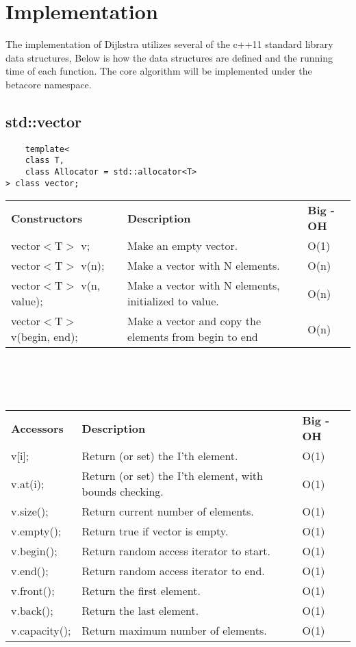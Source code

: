 \documentclass[12pt]{article}
\begin{document}
\section[Implementation]{Implementation}
The implementation of Dijkstra utilizes several of the c++11 standard library data structures,
Below is how the data structures are defined and the running time of each function\cite{ northwestern}.
The core algorithm will be implemented under the betacore namespace.
\subsection{std::vector}
\begin{lstlisting}
	template<
    class T,
    class Allocator = std::allocator<T>
> class vector;
\end{lstlisting}
\begin{tabular}{ l l l }
\textbf{Constructors} & \textbf{Description} & \textbf{Big - OH}\\
vector$<$T$>$ v; & Make an empty vector. & O(1)\\
vector$<$T$>$ v(n); & Make a vector with N elements. & O(n)\\
vector$<$T$>$ v(n, value); & Make a vector with N elements, initialized to value. & O(n)\\
vector$<$T$>$ v(begin, end); & Make a vector and copy the elements from begin to end & O(n)\\
\end{tabular}
\\
\\
\\
\begin{tabular}{ l l l }
\textbf{Accessors} & \textbf{Description} & \textbf{Big - OH}\\
v[i]; & Return (or set) the I'th element. & O(1)\\
v.at(i); & Return (or set) the I'th element, with bounds checking. & O(1)\\
v.size(); & Return current number of elements. & O(1)\\
v.empty(); & Return true if vector is empty. & O(1)\\
v.begin(); & Return random access iterator to start. & O(1)\\
v.end(); & Return random access iterator to end. & O(1)\\
v.front(); & Return the first element. & O(1)\\
v.back(); & Return the last element. & O(1)\\
v.capacity(); & Return maximum number of elements. & O(1)\\
\end{tabular}
\end{document}
